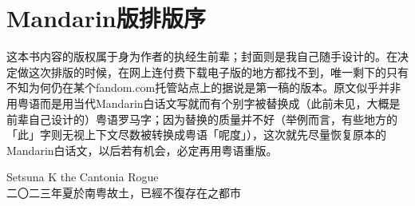 
\chapter*{Mandarin版排版序}

这本书内容的版权属于身为作者的执经生前辈；封面则是我自己随手设计的。在决定做这次排版的时候，在网上连付费下载电子版的地方都找不到，唯一剩下的只有不知为何仍在某个fandom.com托管站点上的据说是第一稿的版本。原文似乎并非用粤语而是用当代Mandarin白话文写就而有个别字被替换成（此前未见，大概是前辈自己设计的）粤语罗马字；因为替换的质量并不好（举例而言，有些地方的「此」字则无视上下文尽数被转换成粤语「呢度」），这次就先尽量恢复原本的Mandarin白话文，以后若有机会，必定再用粤语重版。

\begin{flushright}
	Setsuna K the Cantonia Rogue \\
	二〇二三年夏於南粤故土，已經不復存在之都市
\end{flushright}